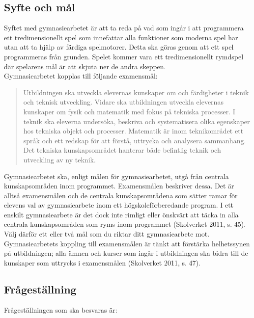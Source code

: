\documentclass[12pt, a4paper]{article}
\begin{document}
	\subsection{Syfte och mål}
	
	Syftet med gymnasiearbetet är att ta reda på vad som ingår i att programmera ett tredimensionellt spel som innefattar alla funktioner som moderna spel har utan att ta hjälp av färdiga spelmotorer. Detta ska göras genom att ett spel programmeras från grunden. Spelet kommer vara ett tredimensionellt rymdspel där spelarens mål är att skjuta ner de andra skeppen. \\
	
	\noindent Gymnasiearbetet kopplas till följande examensmål:
	
	\begin{quote} \small
		Utbildningen ska utveckla elevernas kunskaper om och färdigheter i teknik och teknisk utveckling. Vidare ska utbildningen utveckla elevernas kunskaper om fysik och matematik med fokus på tekniska processer. I teknik ska eleverna undersöka, beskriva och systematisera olika egenskaper hos tekniska objekt och processer. Matematik är inom teknikområdet ett språk och ett redskap för att förstå, uttrycka och analysera sammanhang. Det tekniska kunskapsområdet hanterar både befintlig teknik och utveckling av ny teknik.
	\end{quote}
	
	\begin{small}
		Gymnasiearbetet ska, enligt målen för gymnasiearbetet, utgå från centrala
kunskapsområden inom programmet. Examensmålen beskriver dessa. Det är
alltså examensmålen och de centrala kunskapsområdena som sätter ramar för
elevens val av gymnasiearbete inom ett högskoleförberedande program. I ett
enskilt gymnasiearbete är det dock inte rimligt eller önskvärt att täcka in alla
centrala kunskapsområden som ryms inom programmet (Skolverket 2011, s.
45). Välj därför ett eller två mål som du riktar ditt gymnasiearbete mot.
Gymnasiearbetets koppling till examensmålen är tänkt att förstärka
helhetssynen på utbildningen; alla ämnen och kurser som ingår i utbildningen
ska bidra till de kunskaper som uttrycks i examensmålen (Skolverket 2011, s.
47).
	\end{small}
	
	\subsection{Frågeställning}
	
	Frågeställningen som ska besvaras är: 
\end{document}
